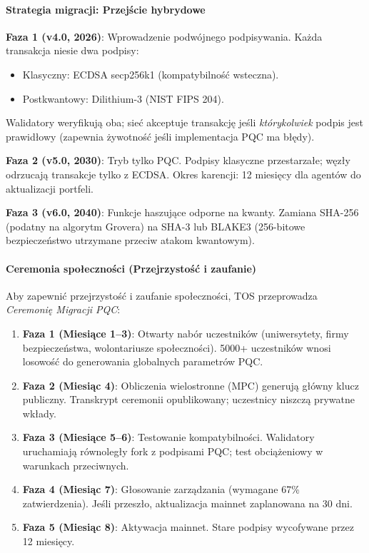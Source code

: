 \documentclass[11pt]{article}
\begin{document}
\paragraph{Strategia migracji: Przejście hybrydowe}
\textbf{Faza 1 (v4.0, 2026)}: Wprowadzenie podwójnego podpisywania. Każda transakcja niesie dwa podpisy:
\begin{itemize}[noitemsep]
  \item Klasyczny: ECDSA secp256k1 (kompatybilność wsteczna).
  \item Postkwantowy: Dilithium-3 (NIST FIPS 204).
\end{itemize}
Walidatory weryfikują oba; sieć akceptuje transakcję jeśli \emph{którykolwiek} podpis jest prawidłowy (zapewnia żywotność jeśli implementacja PQC ma błędy).

\textbf{Faza 2 (v5.0, 2030)}: Tryb tylko PQC. Podpisy klasyczne przestarzałe; węzły odrzucają transakcje tylko z ECDSA. Okres karencji: 12 miesięcy dla agentów do aktualizacji portfeli.

\textbf{Faza 3 (v6.0, 2040)}: Funkcje haszujące odporne na kwanty. Zamiana SHA-256 (podatny na algorytm Grovera) na SHA-3 lub BLAKE3 (256-bitowe bezpieczeństwo utrzymane przeciw atakom kwantowym).

\paragraph{Ceremonia społeczności (Przejrzystość i zaufanie)}
Aby zapewnić przejrzystość i zaufanie społeczności, TOS przeprowadza \emph{Ceremonię Migracji PQC}:
\begin{enumerate}[noitemsep]
  \item \textbf{Faza 1 (Miesiące 1--3)}: Otwarty nabór uczestników (uniwersytety, firmy bezpieczeństwa, wolontariusze społeczności). 5000+ uczestników wnosi losowość do generowania globalnych parametrów PQC.
  \item \textbf{Faza 2 (Miesiąc 4)}: Obliczenia wielostronne (MPC) generują główny klucz publiczny. Transkrypt ceremonii opublikowany; uczestnicy niszczą prywatne wkłady.
  \item \textbf{Faza 3 (Miesiące 5--6)}: Testowanie kompatybilności. Walidatory uruchamiają równoległy fork z podpisami PQC; test obciążeniowy w warunkach przeciwnych.
  \item \textbf{Faza 4 (Miesiąc 7)}: Głosowanie zarządzania (wymagane 67\% zatwierdzenia). Jeśli przeszło, aktualizacja mainnet zaplanowana na 30 dni.
  \item \textbf{Faza 5 (Miesiąc 8)}: Aktywacja mainnet. Stare podpisy wycofywane przez 12 miesięcy.
\end{enumerate}
\end{document}
